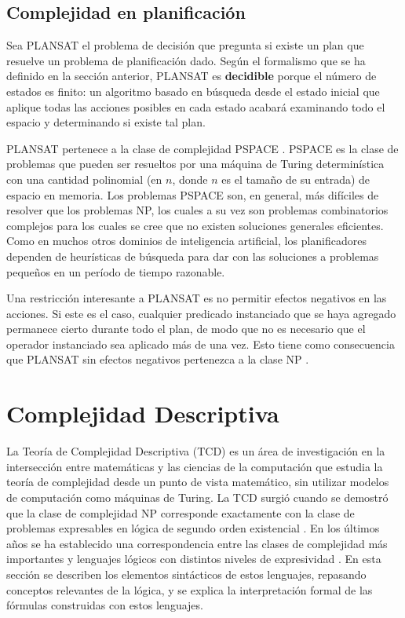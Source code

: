 \subsection{Complejidad en planificación}
\label{complejidad_planificacion}
Sea PLANSAT el problema de decisión que pregunta si existe un plan que
resuelve un problema de planificación dado. Según el formalismo que se ha definido
en la sección anterior,
PLANSAT es \textbf{decidible} porque el número de estados es finito:
un algoritmo basado en búsqueda desde el estado inicial que aplique
todas las acciones posibles en cada estado acabará examinando todo el espacio y
determinando si existe tal plan.

PLANSAT pertenece a la clase de complejidad PSPACE
\citep{bylander:plan-complexity}.
PSPACE es la clase de problemas que pueden ser resueltos por una máquina de
Turing determinística con una cantidad polinomial (en $n$, donde $n$ es el
tamaño de su entrada) de espacio en memoria. Los problemas PSPACE son, en
general, más difíciles de resolver que los problemas NP, los cuales a su vez
son problemas combinatorios complejos para los cuales se cree que no existen
soluciones generales eficientes. Como en muchos otros dominios de inteligencia
artificial, los planificadores dependen de
heurísticas de búsqueda para dar con las soluciones a problemas pequeños en un 
período de tiempo razonable.

Una restricción interesante a PLANSAT es no permitir efectos negativos en las
acciones. Si este es el caso, cualquier predicado instanciado que se haya 
agregado permanece cierto durante todo el plan, de modo que no es necesario
que el operador instanciado sea aplicado más de una vez.
Esto tiene como consecuencia que PLANSAT sin efectos 
negativos pertenezca a la clase NP \citep{ghallab:book}.

\section{Complejidad Descriptiva}
La Teoría de Complejidad Descriptiva (TCD) es un área de investigación en la
intersección entre matemáticas y las ciencias de la computación 
que estudia la teoría de complejidad desde un punto de vista matemático, 
sin utilizar modelos de computación como máquinas de Turing. La TCD surgió
cuando se demostró que la clase de complejidad NP corresponde
exactamente con la clase de problemas expresables en lógica de segundo orden
existencial \citep{fagin:spectra}. En los últimos años se ha establecido una
correspondencia entre las clases de complejidad más importantes y lenguajes
lógicos con distintos niveles de expresividad \citep{immerman:book}. En esta
sección se describen los elementos sintácticos de estos lenguajes, repasando
conceptos relevantes de la lógica, y se explica la interpretación formal de
las fórmulas construidas con estos lenguajes.

